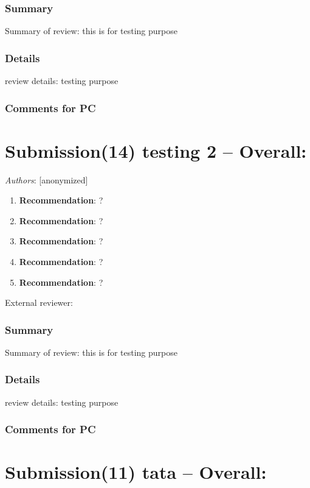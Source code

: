 \documentclass{article}
\begin{document}
   \subsubsection*{Summary}
   Summary of review: this is for testing purpose
      
   \subsubsection*{Details}
   review details: testing purpose

   \subsubsection*{Comments for PC}
   

 

\section{Submission(14) testing 2 -- Overall: }  

\textit{Authors}: [anonymized]

     
\begin{enumerate}
    
      \item \textbf{Recommendation}: ?
      \item \textbf{Recommendation}: ?
      \item \textbf{Recommendation}: ?
      \item \textbf{Recommendation}: ?
      \item \textbf{Recommendation}: ?
 \end{enumerate}
External reviewer:      
   \subsubsection*{Summary}
   Summary of review: this is for testing purpose
      
   \subsubsection*{Details}
   review details: testing purpose

   \subsubsection*{Comments for PC}
   

 

\section{Submission(11) tata -- Overall: }  
\end{document}
